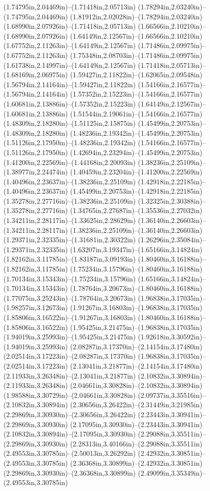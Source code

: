 (1.74795in,2.04469in)--(1.71418in,2.05713in) (1.78294in,2.03240in)--(1.74795in,2.04469in) (1.81912in,2.02028in)--(1.78294in,2.03240in) (1.68990in,2.07926in)--(1.71418in,2.05713in) (1.66566in,2.10210in)--(1.68990in,2.07926in) (1.64149in,2.12567in)--(1.66566in,2.10210in) (1.67752in,2.11263in)--(1.64149in,2.12567in) (1.71486in,2.09975in)--(1.67752in,2.11263in) (1.75348in,2.08703in)--(1.71486in,2.09975in) (1.61738in,2.14997in)--(1.64149in,2.12567in) (1.71418in,2.05713in)--(1.68169in,2.06975in) (1.59427in,2.11822in)--(1.62065in,2.09548in) (1.56794in,2.14164in)--(1.59427in,2.11822in) (1.54166in,2.16577in)--(1.56794in,2.14164in) (1.57352in,2.15223in)--(1.54166in,2.16577in) (1.60681in,2.13886in)--(1.57352in,2.15223in) (1.64149in,2.12567in)--(1.60681in,2.13886in) (1.51544in,2.19061in)--(1.54166in,2.16577in) (1.48309in,2.18280in)--(1.51125in,2.15875in) (1.45499in,2.20753in)--(1.48309in,2.18280in) (1.48236in,2.19342in)--(1.45499in,2.20753in) (1.51126in,2.17950in)--(1.48236in,2.19342in) (1.54166in,2.16577in)--(1.51126in,2.17950in) (1.42694in,2.23294in)--(1.45499in,2.20753in) (1.41200in,2.22569in)--(1.44168in,2.20093in) (1.38236in,2.25109in)--(1.38977in,2.24474in) (1.40459in,2.23204in)--(1.41200in,2.22569in) (1.40496in,2.23637in)--(1.38236in,2.25109in) (1.42918in,2.22185in)--(1.40496in,2.23637in) (1.45499in,2.20753in)--(1.42918in,2.22185in) (1.35278in,2.27716in)--(1.38236in,2.25109in) (1.32325in,2.30388in)--(1.35278in,2.27716in) (1.34765in,2.27687in)--(1.35536in,2.27032in) (1.34211in,2.28117in)--(1.33625in,2.28629in) (1.36140in,2.26603in)--(1.34211in,2.28117in) (1.38236in,2.25109in)--(1.36140in,2.26603in) (1.29371in,2.32335in)--(1.31681in,2.30322in) (1.26296in,2.35084in)--(1.29371in,2.32335in) (1.63207in,3.19347in)--(1.65166in,3.14824in) (1.82162in,3.11785in)--(1.83187in,3.09193in) (1.80460in,3.16188in)--(1.82162in,3.11785in) (1.75234in,3.15796in)--(1.80460in,3.16188in) (1.70134in,3.15343in)--(1.75234in,3.15796in) (1.65166in,3.14824in)--(1.70134in,3.15343in) (1.78764in,3.20673in)--(1.80460in,3.16188in) (1.77075in,3.25243in)--(1.78764in,3.20673in) (1.96838in,3.17035in)--(1.98257in,3.12673in) (1.91267in,3.16803in)--(1.96838in,3.17035in) (1.85806in,3.16522in)--(1.91267in,3.16803in) (1.80460in,3.16188in)--(1.85806in,3.16522in) (1.95425in,3.21475in)--(1.96838in,3.17035in) (1.94019in,3.25993in)--(1.95425in,3.21475in) (1.92618in,3.30592in)--(1.94019in,3.25993in) (2.08287in,3.17370in)--(2.14154in,3.17480in) (2.02514in,3.17223in)--(2.08287in,3.17370in) (1.96838in,3.17035in)--(2.02514in,3.17223in) (2.13041in,3.21877in)--(2.14154in,3.17480in) (2.11933in,3.26348in)--(2.13041in,3.21877in) (2.10832in,3.30894in)--(2.11933in,3.26348in) (2.04661in,3.30828in)--(2.10832in,3.30894in) (1.98588in,3.30729in)--(2.04661in,3.30828in) (2.09737in,3.35516in)--(2.10832in,3.30894in) (2.30656in,3.26422in)--(2.31449in,3.21985in) (2.29869in,3.30930in)--(2.30656in,3.26422in) (2.23443in,3.30941in)--(2.29869in,3.30930in) (2.17095in,3.30930in)--(2.23443in,3.30941in) (2.10832in,3.30894in)--(2.17095in,3.30930in) (2.29088in,3.35511in)--(2.29869in,3.30930in) (2.28313in,3.40166in)--(2.29088in,3.35511in) (2.49553in,3.30785in)--(2.50013in,3.26292in) (2.42932in,3.30851in)--(2.49553in,3.30785in) (2.36368in,3.30899in)--(2.42932in,3.30851in) (2.29869in,3.30930in)--(2.36368in,3.30899in) (2.49099in,3.35349in)--(2.49553in,3.30785in) 